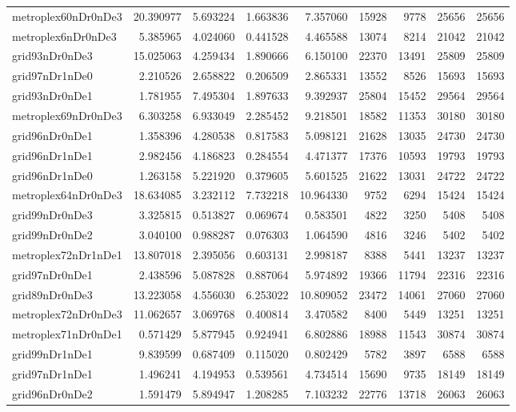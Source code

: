 \begin{longtable}{|l|r|r|r|r|r|r|r|r|}
metroplex60nDr0nDe3 & 20.390977 & 5.693224 & 1.663836 & 7.357060 & 15928 & 9778 & 25656 & 25656 \\
metroplex6nDr0nDe3 & 5.385965 & 4.024060 & 0.441528 & 4.465588 & 13074 & 8214 & 21042 & 21042 \\
grid93nDr0nDe3 & 15.025063 & 4.259434 & 1.890666 & 6.150100 & 22370 & 13491 & 25809 & 25809 \\
grid97nDr1nDe0 & 2.210526 & 2.658822 & 0.206509 & 2.865331 & 13552 & 8526 & 15693 & 15693 \\
grid93nDr0nDe1 & 1.781955 & 7.495304 & 1.897633 & 9.392937 & 25804 & 15452 & 29564 & 29564 \\
metroplex69nDr0nDe3 & 6.303258 & 6.933049 & 2.285452 & 9.218501 & 18582 & 11353 & 30180 & 30180 \\
grid96nDr0nDe1 & 1.358396 & 4.280538 & 0.817583 & 5.098121 & 21628 & 13035 & 24730 & 24730 \\
grid96nDr1nDe1 & 2.982456 & 4.186823 & 0.284554 & 4.471377 & 17376 & 10593 & 19793 & 19793 \\
grid96nDr1nDe0 & 1.263158 & 5.221920 & 0.379605 & 5.601525 & 21622 & 13031 & 24722 & 24722 \\
metroplex64nDr0nDe3 & 18.634085 & 3.232112 & 7.732218 & 10.964330 & 9752 & 6294 & 15424 & 15424 \\
grid99nDr0nDe3 & 3.325815 & 0.513827 & 0.069674 & 0.583501 & 4822 & 3250 & 5408 & 5408 \\
grid99nDr0nDe2 & 3.040100 & 0.988287 & 0.076303 & 1.064590 & 4816 & 3246 & 5402 & 5402 \\
metroplex72nDr1nDe1 & 13.807018 & 2.395056 & 0.603131 & 2.998187 & 8388 & 5441 & 13237 & 13237 \\
grid97nDr0nDe1 & 2.438596 & 5.087828 & 0.887064 & 5.974892 & 19366 & 11794 & 22316 & 22316 \\
grid89nDr0nDe3 & 13.223058 & 4.556030 & 6.253022 & 10.809052 & 23472 & 14061 & 27060 & 27060 \\
metroplex72nDr0nDe3 & 11.062657 & 3.069768 & 0.400814 & 3.470582 & 8400 & 5449 & 13251 & 13251 \\
metroplex71nDr0nDe1 & 0.571429 & 5.877945 & 0.924941 & 6.802886 & 18988 & 11543 & 30874 & 30874 \\
grid99nDr1nDe1 & 9.839599 & 0.687409 & 0.115020 & 0.802429 & 5782 & 3897 & 6588 & 6588 \\
grid97nDr1nDe1 & 1.496241 & 4.194953 & 0.539561 & 4.734514 & 15690 & 9735 & 18149 & 18149 \\
grid96nDr0nDe2 & 1.591479 & 5.894947 & 1.208285 & 7.103232 & 22776 & 13718 & 26063 & 26063 \\

\end{longtable}
